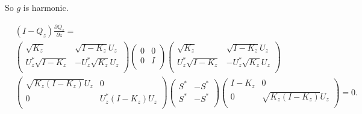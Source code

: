 \documentclass{amsart}
\begin{document}
So $g$ is harmonic.

\begin{align*}
&(I- Q_z)\frac{\partial Q_{z}}{\partial \overline{z}} = \\
& \left(
                                       \begin{array}{cc}
                                         \sqrt{K_z} & \sqrt{I- K_z}U_z \\
                                         U^{*}_z \sqrt{I- K_z} & -U^{*}_{z}\sqrt{K_{z}}U_{z} \\
                                       \end{array}
                                     \right) 
\left(
                                       \begin{array}{cc}
                                        0 & 0 \\
                                        0& I\\
                                       \end{array}
                                     \right) 
\left(
                                       \begin{array}{cc}
                                         \sqrt{K_z} & \sqrt{I- K_z}U_z \\
                                         U^{*}_z \sqrt{I- K_z} & -U^{*}_{z}\sqrt{K_{z}}U_{z} \\
                                       \end{array}
                                     \right)  \\
&\left(
                                        \begin{array}{cc}
                                          \sqrt{K_{z}(I - K_z)}U_z & 0 \\
                                          0 & U^{*}_{z}(I - K_z)U_z \\
                                        \end{array}
                                      \right)
                                      \left(
                                        \begin{array}{cc}
                                          S^{*} & -S^{*} \\
                                          S^{*} & -S^{*} \\
                                        \end{array}
                                      \right) 
                                      \left(
                                        \begin{array}{cc}
                                          I- K_z & 0 \\
                                          0 & \sqrt{K_{z}(I - K_z)}U_z \\
                                        \end{array}
                                      \right) = 0.
\end{align*}
\end{document}
